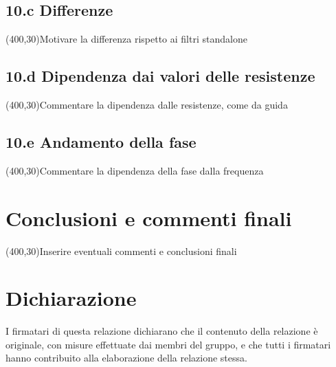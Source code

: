\documentclass[10pt,a4paper]{article}
\begin{document}
\subsection*{10.c Differenze}
\vspace{0.5cm}
\framebox(400,30){Motivare la differenza rispetto ai filtri standalone}

\subsection*{10.d Dipendenza dai valori delle resistenze}
\vspace{0.5cm}
\framebox(400,30){Commentare la dipendenza dalle resistenze, come da guida}

\subsection*{10.e Andamento della fase}
\vspace{0.5cm}
\framebox(400,30){Commentare la dipendenza della fase dalla frequenza}

\section*{Conclusioni e commenti finali}
\framebox(400,30){Inserire eventuali commenti e conclusioni finali}

\section*{Dichiarazione}
I firmatari di questa relazione dichiarano che il contenuto della relazione \`e originale, con misure effettuate dai membri del gruppo, e che tutti i firmatari hanno contribuito alla elaborazione della relazione stessa.
\end{document}
